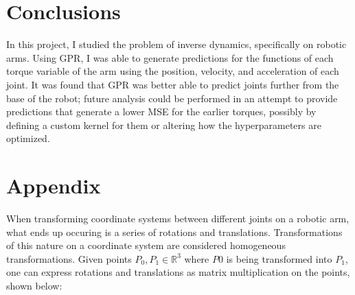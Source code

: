 \documentclass{article}
\begin{document}
    \section{Conclusions}
    
    In this project, I studied the problem of inverse dynamics, specifically on robotic arms.
    Using GPR, I was able to generate predictions for the functions of each torque variable
    of the arm using the position, velocity, and acceleration of each joint. It was found that
    GPR was better able to predict joints further from the base of the robot; future analysis
    could be performed in an attempt to provide predictions that generate a lower MSE for the
    earlier torques, possibly by defining a custom kernel for them or altering how the
    hyperparameters are optimized.
    
    \clearpage
    \renewcommand*{\bibfont}{\raggedright}
    
    
    
    \clearpage
    \section{Appendix}
    \label{sec:appendix}
    
    When transforming coordinate systems between different joints on a robotic arm, what ends up
    occuring is a series of rotations and translations. Transformations of this nature on a
    coordinate system are considered homogeneous transformations. Given points
    $P_{0}, P_{1} \in \mathbb{R}^{3}$ where $P{0}$ is being transformed into $P_{1}$, one can
    express rotations and translations as matrix multiplication on the points, shown below:
    
\end{document}
